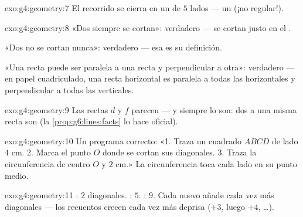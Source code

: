 \begin{solution}{exo:g4:geometry:7}
El recorrido se cierra en un  de $5$ lados --- un  (¡no
regular!).
\end{solution}

\begin{solution}{exo:g4:geometry:8}
«Dos  siempre se cortan»: verdadero --- se cortan justo en el
.

«Dos  no se cortan nunca»: verdadero --- esa es su definición.

«Una recta puede ser paralela a una recta y perpendicular a
otra»: verdadero --- en papel cuadriculado, una recta horizontal es paralela a
todas las horizontales y perpendicular a todas las verticales.
\end{solution}

\begin{solution}{exo:g4:geometry:9}
Las rectas $d$ y $f$ parecen  --- y siempre lo son: dos
 a una misma recta son 
(la \cref{prop:g6:lines:facts} lo hace oficial).
\end{solution}

\begin{solution}{exo:g4:geometry:10}
Un programa correcto: «1. Traza un cuadrado $ABCD$ de lado $4$ cm.
2. Marca el punto $O$ donde se cortan sus diagonales. 3. Traza la circunferencia
de centro $O$ y  $2$ cm.» La circunferencia toca cada lado en
su punto medio.
\end{solution}

\begin{solution}{exo:g4:geometry:11}
: $2$ diagonales. : $5$. : $9$. Cada 
nuevo añade cada vez más diagonales --- los recuentos crecen cada vez
más deprisa ($+3$, luego $+4$, \dots).
\end{solution}
